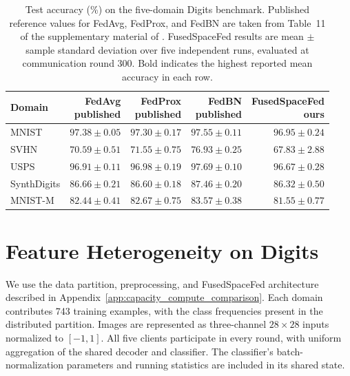 \begin{table}[t]
\coauthorcolor
\centering
\small
\setlength{\tabcolsep}{9pt}
\caption{Test accuracy (\%) on the five-domain Digits benchmark.
Published reference values for FedAvg, FedProx, and FedBN are taken from
Table~11 of the supplementary material of \citet{li2021fedbn}.
FusedSpaceFed results are mean $\pm$ sample standard deviation over five
independent runs, evaluated at communication round 300.
Bold indicates the highest reported mean accuracy in each row.}
\label{tab:feature_heterogeneity_digits}
\begin{tabular}{lrrrr}
\toprule
Domain & \shortstack{FedAvg\\published} & \shortstack{FedProx\\published}
       & \shortstack{FedBN\\published} & \shortstack{FusedSpaceFed\\ours} \\
\midrule
MNIST       & $97.38\pm0.05$ & $97.30\pm0.17$ & $\boldsymbol{97.55\pm0.11}$ & $96.95\pm0.24$ \\
SVHN        & $70.59\pm0.51$ & $71.55\pm0.75$ & $\boldsymbol{76.93\pm0.25}$ & $67.83\pm2.88$ \\
USPS        & $96.91\pm0.11$ & $96.98\pm0.19$ & $\boldsymbol{97.69\pm0.10}$ & $96.67\pm0.28$ \\
SynthDigits & $86.66\pm0.21$ & $86.60\pm0.18$ & $\boldsymbol{87.46\pm0.20}$ & $86.32\pm0.50$ \\
MNIST-M     & $82.44\pm0.41$ & $82.67\pm0.75$ & $\boldsymbol{83.57\pm0.38}$ & $81.55\pm0.77$ \\
\bottomrule
\end{tabular}
\end{table}

\newpage
\section{Feature Heterogeneity on Digits}
\label{app:feature_heterogeneity_digits}

We use the data partition, preprocessing, and FusedSpaceFed architecture
described in Appendix~\ref{app:capacity_compute_comparison}. Each domain
contributes 743 training examples, with the class frequencies present in
the distributed partition. Images are represented as three-channel
$28\times28$ inputs normalized to $[-1,1]$. All five clients participate
in every round, with uniform aggregation of the shared decoder and
classifier. The classifier's batch-normalization parameters and running
statistics are included in its shared state.

